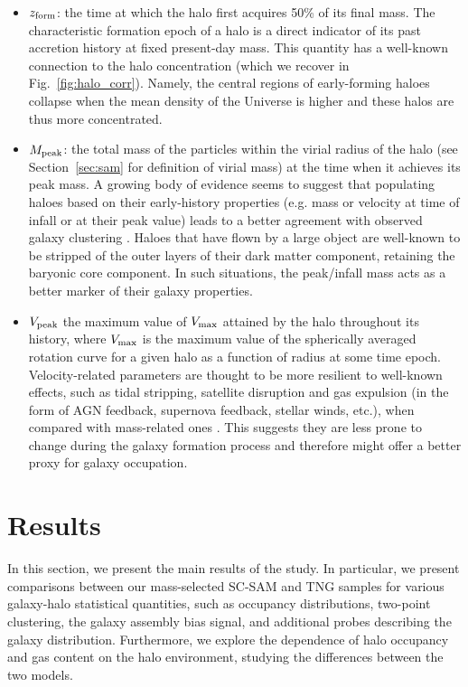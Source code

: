 \documentclass[fleqn,usenatbib]{mnras}
\newcommand{\rss}[1]{\textcolor{purple}{(rss: #1)}}
\begin{document}
\begin{itemize}
    \item $z_{\rm form}$: the time at which the halo first acquires 50\% of its final mass. The characteristic formation epoch of a halo is a direct indicator of its past accretion history at fixed present-day mass. This quantity has a well-known connection to the halo concentration (which we recover in Fig.~\ref{fig:halo_corr}). Namely, the central regions of early-forming haloes collapse when the mean density of the Universe is higher and these halos are thus more concentrated.  
    \item $M_{\rm peak}$: the total mass of the particles within the virial radius of the halo (see Section~\ref{sec:sam} for definition of virial mass) at the time when it achieves its peak mass. A growing body of evidence seems to suggest that populating haloes based on their early-history properties (e.g. mass or velocity at time of infall or at their peak value) leads to a better agreement with observed galaxy clustering \citep[e.g.][]{2016MNRAS.460.3100C}. Haloes that have flown by a large object are well-known to be stripped of the outer layers of their dark matter component, retaining the baryonic core component. In such situations, the peak/infall mass acts as a better marker of their galaxy properties.
    \item $V_{\rm peak}$ the maximum value of $V_{\rm max}$ 
    attained by the halo throughout its history, where $V_{\rm max}$ is the maximum value of the spherically averaged rotation curve for a given halo as a function of radius at some time epoch. Velocity-related parameters are thought to be more resilient to  well-known effects, such as tidal stripping, satellite disruption and gas expulsion (in the form of AGN feedback, supernova feedback, stellar winds, etc.), when compared with mass-related ones \citep[e.g.][]{2016MNRAS.459.3040G}. This suggests they are less prone to change during the galaxy formation process and therefore might offer a better proxy for galaxy occupation.
\end{itemize}

\section{Results}
\label{sec:res}
In this section, we present the main results of the study. In particular, we present comparisons between our mass-selected SC-SAM and TNG samples for various galaxy-halo statistical quantities, such as occupancy distributions, two-point clustering, the galaxy assembly bias signal, and additional probes describing the galaxy distribution. Furthermore, we explore the dependence of halo occupancy and gas content on the halo environment, studying the differences between the two models.
\end{document}
